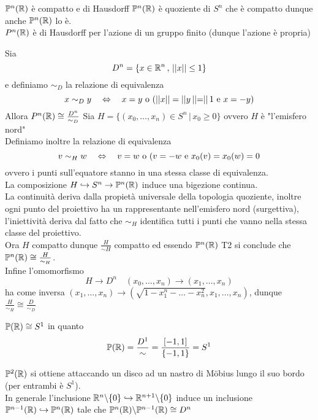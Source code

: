 \spazio
\begin{cor}$\mathbb{P}^n(\mathbb{R})$ \`e compatto e di Hausdorff
\proof $\mathbb{P}^n(\mathbb{R})$ \`e quoziente di $S^n$ che \`e compatto dunque anche $\mathbb{P}^n(\mathbb{R})$ lo \`e.\\
$P^n(\mathbb{R})$ \`e di Hausdorff per l'azione di un gruppo finito (dunque l'azione \`e propria) \endproof
\end{cor}
\begin{prop}Sia $$D^n=\{ x\in \mathbb{R}^n\, , \, \vert\vert x \vert \vert \leq 1 \}$$ e definiamo $\sim_D$ la relazione di equivalenza
$$ x \sim_D y \quad \Leftrightarrow \quad x =y \text{ o } ( \vert \vert x\vert \vert = \vert \vert y \left\vert\left\vert = \right\vert \right\vert1 \text{ e } x = -y )$$
Allora $P^n (\mathbb{R}) \cong \frac{D^n }{\sim_D}$
\proof Sia $H =\{ (x_0, \dots, x_n ) \in S^n \, \vert \, x_0 \geq 0\}$ ovvero $H$ \`e "l'emisfero nord"\\
Definiamo inoltre la relazione di equivalenza
$$ v \sim_H w \quad \Leftrightarrow \quad v =w \text{ o } ( v = -w \text{ e } x_0(v)=x_0(w)=0$$
ovvero i punti sull'equatore stanno in una stessa classe di equivalenza.\\
La composizione $ H \hookrightarrow S^n \to \mathbb{P}^n(\mathbb{R})$ induce una bigezione continua.\\
La continuit\`a deriva dalla propiet\`a universale della topologia quoziente, inoltre ogni punto del proiettivo ha un rappresentante nell'emisfero nord (surgettiva), l'iniettivit\`a deriva dal fatto che $\sim_H$ identifica tutti i punti che vanno nella stessa classe del proiettivo.\\
Ora $H$ compatto dunque $ \frac{H}{\sim H}$ compatto ed essendo $\mathbb{P}^n(\mathbb{R})$ T2 si conclude che $ \mathbb{P}^n(\mathbb{R}) \cong \frac{H}{
\sim_H}$.\\
Infine l'omomorfismo $$H \to D^n \quad (x_0, \dots, x_n) \to (x_1, \dots, x_n)$$ ha come inversa $(x_1, \dots, x_n ) \to ( \sqrt{1-x_1^n - \dots - x_n^2}, x_1, \dots, x_n)$, dunque $\frac{H}{\sim_H} \cong\frac{D}{\sim_D}$\\
\endproof
\end{prop}
\begin{oss}$\mathbb{P}(\mathbb{R})\cong S^1$ in quanto 
$$\mathbb{P}(\mathbb{R}) = \frac{D^1}{\sim} = \frac{[-1,1]}{\{ -1,1 \}}=S^1$$
\end{oss}
\begin{oss} $\mathbb{P}^2(\mathbb{R})$ si ottiene attaccando un disco ad un nastro di Möbius lungo il suo bordo (per entrambi \`e $S^1$).\\
In generale l'inclusione $\mathbb{R}^n \backslash \{ 0 \} \hookrightarrow \mathbb{R}^{n+1}\backslash \{0 \}$ induce un inclusione $\mathbb{P}^{n-1}(\mathbb{R}) \hookrightarrow \mathbb{P}^n (\mathbb{R})$ tale che $\mathbb{P}^n (\mathbb{R}) \backslash \mathbb{P}^{n-1}(\mathbb{R}) \cong D^n$
\end{oss}
